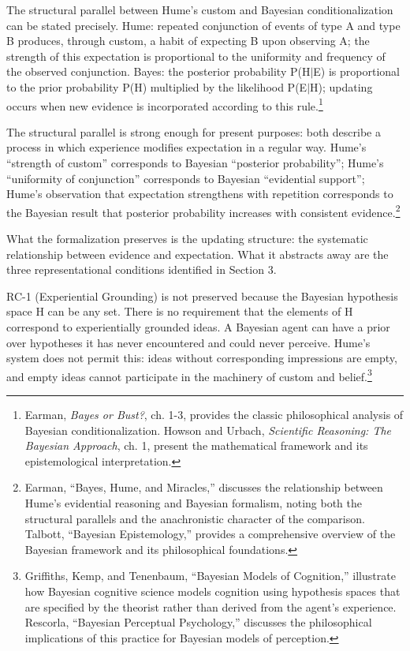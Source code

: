 \documentclass[11pt]{article}
\begin{document}
The structural parallel between Hume's custom and Bayesian conditionalization can be stated precisely. Hume: repeated conjunction of events of type A and type B produces, through custom, a habit of expecting B upon observing A; the strength of this expectation is proportional to the uniformity and frequency of the observed conjunction. Bayes: the posterior probability P(H$|$E) is proportional to the prior probability P(H) multiplied by the likelihood P(E$|$H); updating occurs when new evidence is incorporated according to this rule.\footnote{Earman, \emph{Bayes or Bust?}, ch. 1-3, provides the classic philosophical analysis of Bayesian conditionalization. Howson and Urbach, \emph{Scientific Reasoning: The Bayesian Approach}, ch. 1, present the mathematical framework and its epistemological interpretation.}

The structural parallel is strong enough for present purposes: both describe a process in which experience modifies expectation in a regular way. Hume's ``strength of custom'' corresponds to Bayesian ``posterior probability''; Hume's ``uniformity of conjunction'' corresponds to Bayesian ``evidential support''; Hume's observation that expectation strengthens with repetition corresponds to the Bayesian result that posterior probability increases with consistent evidence.\footnote{Earman, ``Bayes, Hume, and Miracles,'' discusses the relationship between Hume's evidential reasoning and Bayesian formalism, noting both the structural parallels and the anachronistic character of the comparison. Talbott, ``Bayesian Epistemology,'' provides a comprehensive overview of the Bayesian framework and its philosophical foundations.}

What the formalization preserves is the updating structure: the systematic relationship between evidence and expectation. What it abstracts away are the three representational conditions identified in Section 3.

RC-1 (Experiential Grounding) is not preserved because the Bayesian hypothesis space H can be any set. There is no requirement that the elements of H correspond to experientially grounded ideas. A Bayesian agent can have a prior over hypotheses it has never encountered and could never perceive. Hume's system does not permit this: ideas without corresponding impressions are empty, and empty ideas cannot participate in the machinery of custom and belief.\footnote{Griffiths, Kemp, and Tenenbaum, ``Bayesian Models of Cognition,'' illustrate how Bayesian cognitive science models cognition using hypothesis spaces that are specified by the theorist rather than derived from the agent's experience. Rescorla, ``Bayesian Perceptual Psychology,'' discusses the philosophical implications of this practice for Bayesian models of perception.}
\end{document}
